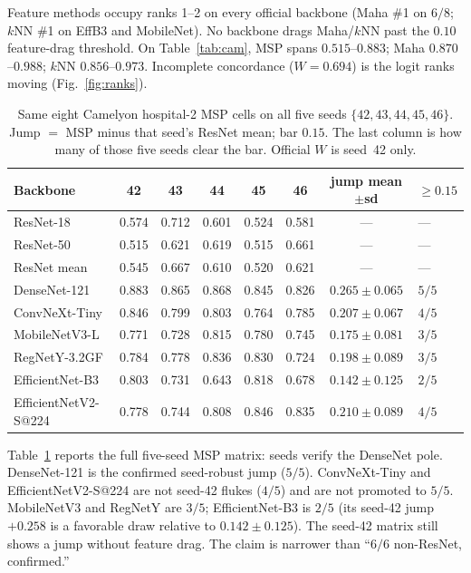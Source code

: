 \documentclass[10pt,twocolumn,letterpaper]{article}
\begin{document}
Feature methods occupy ranks 1--2 on every official backbone (Maha \#1 on $6/8$; $k$NN \#1 on EffB3 and MobileNet).
No backbone drags Maha/$k$NN past the $0.10$ feature-drag threshold.
On Table~\ref{tab:cam}, MSP spans $0.515$--$0.883$; Maha $0.870$--$0.988$; $k$NN $0.856$--$0.973$.
Incomplete concordance ($W{=}0.694$) is the logit ranks moving (Fig.~\ref{fig:ranks}).

\begin{table}[t]
\centering
\small
\begin{tabular}{@{}lccccccl@{}}
\toprule
Backbone & 42 & 43 & 44 & 45 & 46 & jump mean${\pm}$sd & ${\ge}0.15$ \\
\midrule
ResNet-18 & 0.574 & 0.712 & 0.601 & 0.524 & 0.581 & --- & --- \\
ResNet-50 & 0.515 & 0.621 & 0.619 & 0.515 & 0.661 & --- & --- \\
ResNet mean & 0.545 & 0.667 & 0.610 & 0.520 & 0.621 & --- & --- \\
DenseNet-121 & 0.883 & 0.865 & 0.868 & 0.845 & 0.826 & $0.265{\pm}0.065$ & $5/5$ \\
ConvNeXt-Tiny & 0.846 & 0.799 & 0.803 & 0.764 & 0.785 & $0.207{\pm}0.067$ & $4/5$ \\
MobileNetV3-L & 0.771 & 0.728 & 0.815 & 0.780 & 0.745 & $0.175{\pm}0.081$ & $3/5$ \\
RegNetY-3.2GF & 0.784 & 0.778 & 0.836 & 0.830 & 0.724 & $0.198{\pm}0.089$ & $3/5$ \\
EfficientNet-B3 & 0.803 & 0.731 & 0.643 & 0.818 & 0.678 & $0.142{\pm}0.125$ & $2/5$ \\
EfficientNetV2-S@224 & 0.778 & 0.744 & 0.808 & 0.846 & 0.835 & $0.210{\pm}0.089$ & $4/5$ \\
\bottomrule
\end{tabular}
\caption{Same eight Camelyon hospital-2 MSP cells on all five seeds $\{42,43,44,45,46\}$.
Jump ${=}$ MSP minus that seed's ResNet mean; bar $0.15$.
The last column is how many of those five seeds clear the bar.
Official $W$ is seed~42 only.}
\label{tab:seeds}
\end{table}

Table~\ref{tab:seeds} reports the full five-seed MSP matrix: seeds verify the DenseNet pole.
DenseNet-121 is the confirmed seed-robust jump ($5/5$).
ConvNeXt-Tiny and EfficientNetV2-S@224 are not seed-42 flukes ($4/5$) and are not promoted to $5/5$.
MobileNetV3 and RegNetY are $3/5$; EfficientNet-B3 is $2/5$ (its seed-42 jump $+0.258$ is a favorable draw relative to $0.142{\pm}0.125$).
The seed-42 matrix still shows a jump without feature drag.
The claim is narrower than ``$6/6$ non-ResNet, confirmed.''
\end{document}
